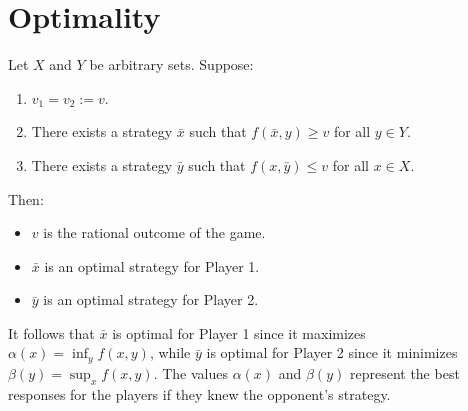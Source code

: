 \section{Optimality}

Let $X$ and $Y$ be arbitrary sets. 
Suppose:
\begin{enumerate}
    \item $v_1 = v_2 := v$.
    \item There exists a strategy $\bar{x}$ such that $f(\bar{x}, y) \geq v$ for all $y \in Y$.
    \item There exists a strategy $\bar{y}$ such that $f(x, \bar{y}) \leq v$ for all $x \in X$. 
\end{enumerate}
Then: 
\begin{itemize} 
    \item $v$ is the rational outcome of the game. 
    \item $\bar{x}$ is an optimal strategy for Player 1. 
    \item $\bar{y}$ is an optimal strategy for Player 2. 
\end{itemize}
It follows that $\bar{x}$ is optimal for Player 1 since it maximizes $\alpha(x) = \inf_y f(x, y)$, while $\bar{y}$ is optimal for Player 2 since it minimizes $\beta(y) = \sup_x f(x, y)$. 
The values $\alpha(x)$ and $\beta(y)$ represent the best responses for the players if they knew the opponent's strategy.

